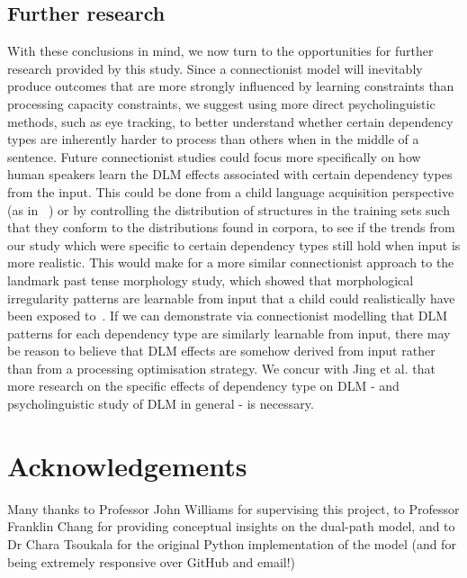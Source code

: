\documentclass{article}
\begin{document}
\subsection{Further research}
With these conclusions in mind, we now turn to the opportunities for further research provided by this study. Since a connectionist model will inevitably produce outcomes that are more strongly influenced by learning constraints than processing capacity constraints, we suggest using more direct psycholinguistic methods, such as eye tracking, to better understand whether certain dependency types are inherently harder to process than others when in the middle of a sentence. Future connectionist studies could focus more specifically on how human speakers learn the DLM effects associated with certain dependency types from the input. This could be done from a child language acquisition perspective (as in ~\cite{twomey2014}) or by controlling the distribution of structures in the training sets such that they conform to the distributions found in corpora, to see if the trends from our study which were specific to certain dependency types still hold when input is more realistic. This would make for a more similar connectionist approach to the landmark past tense morphology study, which showed that morphological irregularity patterns are learnable from input that a child could realistically have been exposed to~\cite{rumelhart1988}. If we can demonstrate via connectionist modelling that DLM patterns for each dependency type are similarly learnable from input, there may be reason to believe that DLM effects are somehow derived from input rather than from a processing optimisation strategy. We concur with Jing et al. that more research on the specific effects of dependency type on DLM - and psycholinguistic study of DLM in general - is necessary.

\section*{Acknowledgements}
 Many thanks to Professor John Williams for supervising this project, to Professor Franklin Chang for providing conceptual insights on the dual-path model, and to Dr Chara Tsoukala for the original Python implementation of the model (and for being extremely responsive over GitHub and email!)








\end{document}
